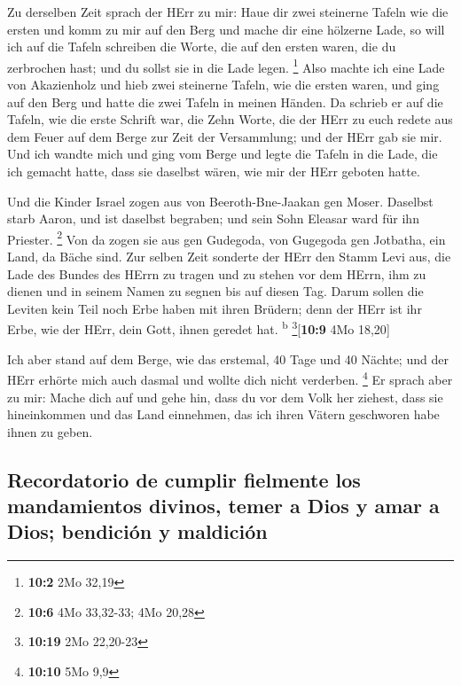  Zu derselben Zeit sprach der HErr zu mir: Haue dir zwei
steinerne Tafeln wie die ersten und komm zu mir auf den Berg und mache
dir eine hölzerne Lade,  so will ich auf die Tafeln
schreiben die Worte, die auf den ersten waren, die du zerbrochen hast;
und du sollst sie in die Lade legen. \footnote{\textbf{10:2} 2Mo 32,19}
 Also machte ich eine Lade von Akazienholz und hieb zwei
steinerne Tafeln, wie die ersten waren, und ging auf den Berg und hatte
die zwei Tafeln in meinen Händen.  Da schrieb er auf die
Tafeln, wie die erste Schrift war, die Zehn Worte, die der HErr zu euch
redete aus dem Feuer auf dem Berge zur Zeit der Versammlung; und der
HErr gab sie mir.  Und ich wandte mich und ging vom Berge
und legte die Tafeln in die Lade, die ich gemacht hatte, dass sie
daselbst wären, wie mir der HErr geboten hatte.

 Und die Kinder Israel zogen aus von Beeroth-Bne-Jaakan
gen Moser. Daselbst starb Aaron, und ist daselbst begraben; und sein
Sohn Eleasar ward für ihn Priester. \footnote{\textbf{10:6} 4Mo
  33,32-33; 4Mo 20,28}  Von da zogen sie aus gen Gudegoda,
von Gugegoda gen Jotbatha, ein Land, da Bäche sind.  Zur
selben Zeit sonderte der HErr den Stamm Levi aus, die Lade des Bundes
des HErrn zu tragen und zu stehen vor dem HErrn, ihm zu dienen und in
seinem Namen zu segnen bis auf diesen Tag.  Darum sollen
die Leviten kein Teil noch Erbe haben mit ihren Brüdern; denn der HErr
ist ihr Erbe, wie der HErr, dein Gott, ihnen geredet hat.
\textsuperscript{b} \footnote{\textbf{10:19} 2Mo 22,20-23}{[}\textbf{10:9}
4Mo 18,20{]}

 Ich aber stand auf dem Berge, wie das erstemal, 40 Tage
und 40 Nächte; und der HErr erhörte mich auch dasmal und wollte dich
nicht verderben. \footnote{\textbf{10:10} 5Mo 9,9}  Er
sprach aber zu mir: Mache dich auf und gehe hin, dass du vor dem Volk
her ziehest, dass sie hineinkommen und das Land einnehmen, das ich ihren
Vätern geschworen habe ihnen zu geben.

\hypertarget{recordatorio-de-cumplir-fielmente-los-mandamientos-divinos-temer-a-dios-y-amar-a-dios-bendiciuxf3n-y-maldiciuxf3n}{%
\subsection{Recordatorio de cumplir fielmente los mandamientos divinos,
temer a Dios y amar a Dios; bendición y
maldición}\label{recordatorio-de-cumplir-fielmente-los-mandamientos-divinos-temer-a-dios-y-amar-a-dios-bendiciuxf3n-y-maldiciuxf3n}}

